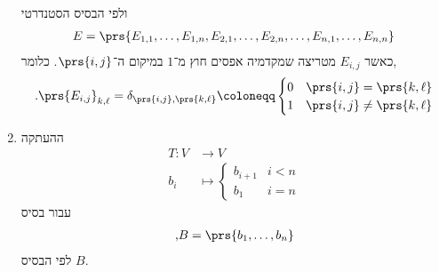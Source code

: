 \documentclass[a4paper,10pt,twoside,openany]{article}
\begin{document}
\begin{exercise}
\begin{enumerate}
ולפי הבסיס הסטנדרטי
\begin{align*}
E = \prs{E_{1,1}, \ldots, E_{1,n}, E_{2,1}, \ldots, E_{2,n}, \ldots, E_{n,1}, \ldots, E_{n,n}}
\end{align*}
כאשר
$E_{i,j}$
מטריצה שמקדמיה אפסים חוץ מ־$1$ במיקום ה־$\prs{i,j}$. כלומר,
\begin{align*}
\text{.} \prs{E_{i,j}}_{k,\ell} = \delta_{\prs{i,j}, \prs{k,\ell}} \coloneqq
\begin{cases}
0 & \prs{i,j} = \prs{k,\ell} \\
1 & \prs{i,j} \neq \prs{k,\ell}
\end{cases}
\end{align*}
\item ההעתקה
\begin{align*}
T \colon V &\to V \\
b_i &\mapsto
\begin{cases}
b_{i+1} & i < n \\
b_1 & i = n
\end{cases}
\end{align*}
עבור בסיס
\begin{align*}
\text{,} B = \prs{b_1, \ldots, b_n}
\end{align*}
לפי הבסיס
$B$.
\end{enumerate}
\end{exercise}
\end{document}
